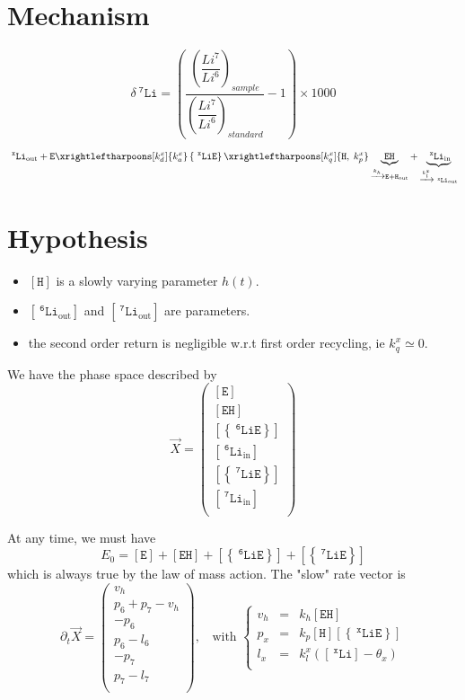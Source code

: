 \documentclass[aps,onecolumn,11pt]{revtex4}
\newcommand{\mychem}[1]{\mathtt{#1}}
\newcommand{\myconc}[1]{\left\lbrack{#1}\right\rbrack}
\newcommand{\spLi}[1]{{~^{\mychem{#1}}\mychem{Li}}}
\newcommand{\Li}[1]{\myconc{\spLi{#1}}}
\newcommand{\spEout}{\mychem{E}}
\newcommand{\Eout}{\myconc{\spEout}}
\newcommand{\spLiE}[1]{\left\lbrace\spLi{#1}\spEout\right\rbrace}
\newcommand{\LiE}[1]{\myconc{\spLiE{#1}}}
\newcommand{\spLiIn}[1]{{\spLi{#1}}_{\mathrm{in}}}
\newcommand{\LiIn}[1]{\myconc{\spLiIn{#1}}}
\newcommand{\spLiOut}[1]{{\spLi{#1}}_{\mathrm{out}}}
\newcommand{\LiOut}[1]{\myconc{\spLiOut{#1}}}
\newcommand{\spEHin}{\mychem{EH}}
\newcommand{\EHin}{\myconc{\spEHin}}
\newcommand{\spproton}{\mychem{H}}
\newcommand{\proton}{\myconc{\spproton}}
\newcommand{\deltaLi}{ {\delta\!\!\spLi{7}} }
\begin{document}
\section{Mechanism}
$$
	\deltaLi = \left(
		\dfrac{\left(\dfrac{Li^7}{Li^6}\right)_{sample}}
		{\left(\dfrac{Li^7}{Li^6}\right)_{standard}}
		 -1 
	\right) \times 1000
$$


\begin{equation}
	 \spLiOut{x} +  \spEout  
	 \xrightleftharpoons[k_d^x]{k_a^x} 
	 \spLiE{x}
	  \xrightleftharpoons[k_q^x]{\mychem{H},\;k_p^x} \underbrace{\spEHin}_{\xrightarrow[]{k_h} \mychem{E} + \mychem{H}_{\mathrm{out}}} + \underbrace{\spLiIn{x}}_{\xrightarrow[]{k_l^x} \spLiOut{x}}
\end{equation}

\section{Hypothesis}
\begin{itemize}
\item $\proton$ is a slowly varying parameter $h(t)$.
\item $\LiOut{6}$ and  $\LiOut{7}$ are parameters.
\item the second order return is negligible w.r.t first order recycling, ie $k_q^x\simeq0$.
\end{itemize}

We have the phase space described by
\begin{equation}
 \vec{X} = 
        \begin{pmatrix}
        \Eout\\
        \EHin\\
        \LiE{6}\\
        \LiIn{6}\\
        \LiE{7}\\
        \LiIn{7}\\
        \end{pmatrix}
\end{equation}

At any time, we must have
\begin{equation} 
	\label{eq:E0}
	E_0 = \Eout + \EHin +  \LiE{6} + \LiE{7}
\end{equation}
which is always true by the law of mass action.
The "slow" rate vector is
\begin{equation}
	\partial_t\vec{X} = 
	\begin{pmatrix}
		v_h\\
		p_6+p_7-v_h\\
		-p_6\\
		p_6-l_6\\
		-p_7\\
		p_7-l_7\\
	\end{pmatrix}
	,\;\;\text{ with }
	\left\lbrace
	\begin{array}{rcl}
	v_h & = & k_h \EHin\\
	p_x & = & k_p \proton \LiE{x}\\
	l_x & = & k_l^x \left(\Li{x}-\theta_x\right)\\
	\end{array}
	\right.
\end{equation}
\end{document}
